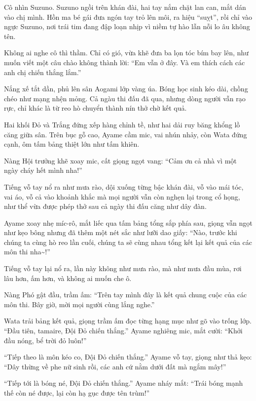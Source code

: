 \documentclass[../main.tex]{subfiles}
\begin{document}
Cô nhìn Suzuno.
Suzuno ngồi trên khán đài, hai tay nắm chặt lan can, mắt dán vào chị mình.
Hồn ma bé gái đưa ngón tay trỏ lên môi, ra hiệu ``suỵt'', rồi chỉ vào ngực Suzuno, nơi trái tim đang đập loạn nhịp vì niềm tự hào lẫn nỗi lo âu không tên.

Không ai nghe cô thì thầm.
Chỉ có gió, vừa khẽ đưa ba lọn tóc bím bay lên, như muốn viết một câu chào không thành lời:
``Em vẫn ở đây.
Và em thích cách các anh chị chiến thắng lắm.''

\il

\ct

Nắng xế tắt dần, phủ lên sân Aogami lớp vàng úa. Bóng học sinh kéo dài, chồng chéo như mạng nhện mỏng. Cả ngàu thi đấu đã qua, nhưng dòng người vẫn rạo rực, chỉ khác là từ reo hò chuyển thành nín thở chờ kết quả.

Hai khối Đỏ và Trắng đứng xếp hàng chỉnh tề, như hai dải ruy băng khổng lồ căng giữa sân. Trên bục gỗ cao, Ayame cầm mic, vai nhún nhảy, còn Wata đứng cạnh, ôm tấm bảng thiệt lớn như tấm khiên.

Nàng Hội trưởng khẽ xoay mic, cất giọng ngọt vang: ``Cảm ơn cả nhà vì một ngày cháy hết mình nha!''

Tiếng vỗ tay nổ ra như mưa rào, dội xuống từng bậc khán đài, vỗ vào mái tóc, vai áo, vỗ cả vào khoảnh khắc mà mọi người vẫn còn nghẹn lại trong cổ họng, như thể vừa được phép thở sau cả ngày thi đấu căng như dây đàn.

Ayame xoay nhẹ míc-rô, mắt liếc qua tấm bảng tổng sắp phía sau, giọng vẫn ngọt như kẹo bông nhưng đã thêm một nét sắc như lưỡi dao giấy: ``Nào, trước khi chúng ta cùng hò reo lần cuối, chúng ta sẽ cùng nhau tổng kết lại kết quả của các môn thi nha\~{}!''

Tiếng vỗ tay lại nổ ra, lần này không như mưa rào, mà như mưa đầu mùa, rơi lâu hơn, ấm hơn, và không ai muốn che ô.

Nàng Phó gật đầu, trầm ấm: ``Trên tay mình đây là kết quả chung cuộc của các môn thi. Bây giờ, mời mọi người cùng lắng nghe.''

Wata trải bảng kết quả, giọng trầm ấm đọc từng hạng mục như gõ vào trống lớp.
``Đầu tiên, tamaire, Đội Đỏ chiến thắng.'' Ayame nghiêng mic, mắt cười: ``Khởi đầu nóng, bể trời đỏ luôn!''

``Tiếp theo là môn kéo co, Đội Đỏ chiến thắng.'' Ayame vỗ tay, giọng như thả kẹo: ``Dây thừng về phe nữ sinh rồi, các anh cứ nằm dưới đất mà ngắm mây!''

``Tiếp tới là bóng né, Đội Đỏ chiến thắng.'' Ayame nháy mắt: ``Trái bóng mạnh thế còn né được, lại còn hạ gục được tên trùm!''
\end{document}
